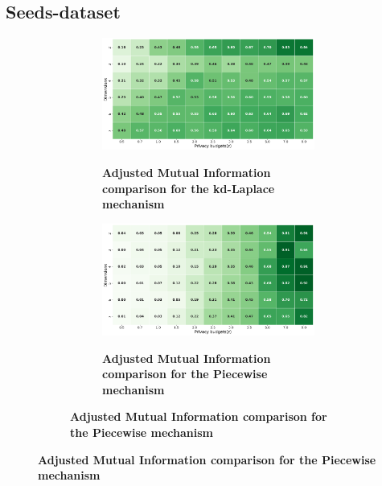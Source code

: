 \subsection{Seeds-dataset}
\begin{figure}[H]
    \centering
    \begin{subfigure}[b]{0.85\textwidth}
        \begin{subfigure}[c]{1\textwidth}
            \caption{\textbf{Adjusted Mutual Information comparison for the kd-Laplace mechanism}}
            \includegraphics[width=1\textwidth]{Results/kd-laplace/kd-Laplace/seeds-dataset/ami.png}
            \label{fig:ami_seeds-dataset_comparison_kdlaplace_2d}
        \end{subfigure}
        \vfill %
        \begin{subfigure}[c]{1\textwidth}
            \caption{\textbf{Adjusted Mutual Information comparison for the Piecewise mechanism}}
            \includegraphics[width=1\textwidth]{Results/kd-laplace/piecewise/seeds-dataset/ami.png}
            \label{fig:ami_seeds-dataset_comparison_piecewise_2d}
        \end{subfigure}
    \end{subfigure}

\end{figure}
